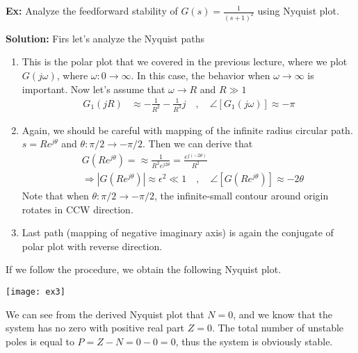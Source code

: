 \documentclass[twoside]{article}
\begin{document}
\newpage

\textbf{Ex:} Analyze the feedforward stability of $G(s) =
\frac{1}{(s+1)^2}$ using Nyquist plot. 

\textbf{Solution:} Firs let's analyze the Nyquist paths
%
\begin{enumerate}
  \item This is the polar plot that we covered in the previous
    lecture, where we plot $G(j \omega)$, where $\omega : 0 \to
    \infty$. In this case, the behavior when $\omega \to \infty$ is
    important. Now let's assume that $\omega \to R$ and $R \gg 1$
  \begin{align*}
   G_1(j R) &\approx -\frac{1}{R^2} - \frac{1}{R^3} j
    \quad , \quad 
    \angle [ G_1(j \omega) ] \approx -\pi
   \end{align*}
%
  \item Again, we should be careful with mapping of  the infinite radius
    circular path. $s = R e^{j \theta}$ and $\theta : \pi/2 \to -\pi/2$.  Then 
   we can derive that  
   \begin{align*}
     & G \left( R e^{j \theta} \right) = \approx \frac{1}{R^2 e^{j
       2 \theta}} = \frac{e^{j (-2 \theta)}}{R^2}
       \\
    &\Rightarrow | G \left( R e^{j \theta} \right) | \approx
      \epsilon^2 \ll 1
   \quad , \quad \angle [ G \left( R e^{j \theta} \right) ] \approx -2
      \theta
   \end{align*}
   Note that when $\theta : \pi/2 \to -\pi/2$, the infinite-small 
   contour around origin rotates in CCW direction. 
   \item Last path (mapping of negative imaginary axis) is again
   the conjugate of polar plot with reverse direction. 
\end{enumerate}

If we follow the procedure, we obtain the following Nyquist plot. 

\vspace{6 pt}

  \begin{minipage}[h]{1\linewidth}
    \begin{center}
      \texttt{[image: ex3]}
    \end{center}
  \end{minipage}

\vspace{6 pt}

We can see from the derived Nyquist plot that $N=0$, and 
we know that the system has no zero with positive real part 
$Z =0$. The total number of unstable poles is equal to
$P = Z - N = 0 - 0 = 0$, thus the system is obviously stable. 
\end{document}
